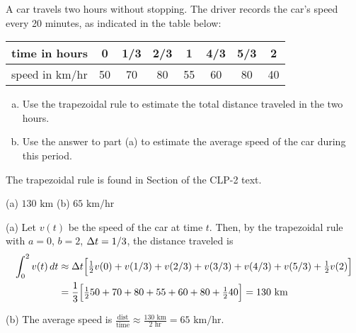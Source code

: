 \begin{Mquestion}[1997A]
A car travels two hours without stopping. The driver records
the car's speed every 20 minutes, as indicated in the table below:

\renewcommand{\arraystretch}{1.1}
\begin{center}
     \begin{tabular}{|l|c|c|c|c|c|c|c|}
          \hline
          time in hours&0&1/3&2/3&1&4/3&5/3&2  \\
          \hline
          speed in km/hr&50&70&80&55&60&80&40 \\
          \hline
     \end{tabular}
\end{center}
\renewcommand{\arraystretch}{1.0}

\begin{enumerate}[(a)]
\item
 Use the trapezoidal rule to estimate the total distance traveled in the two hours.
\item
 Use the answer to part (a)  to estimate the average speed of
the car during this period.
\end{enumerate}
\end{Mquestion}
\begin{hint}
The trapezoidal rule is found in  Section   of the
CLP-2 text.
\end{hint}

\begin{answer}
(a) $130\text{ km}$
\qquad (b)
$65\text{ km/hr}$

\end{answer}

\begin{solution} (a)
 Let $v(t)$ be the speed of the car at time $t$. Then,
by the trapezoidal rule with $a=0$, $b=2$, $\Delta t=1/3$, the distance traveled
is
\begin{align*}
\int_0^2 v(t)\,dt
&\approx\Delta t\Big[\tfrac{1}{2} v(0)+v(1/3)+v(2/3)+v(3/3)
                      +v(4/3)+v(5/3)+\tfrac{1}{2} v(2)\Big]\\
&=\frac{1}{3}\Big[\tfrac{1}{2} 50+70+80+55+60+80+\tfrac{1}{2} 40\Big]
=130\text{ km}
\end{align*}

\noindent (b)
The average speed is $\frac{\text{dist}}{\text{time}} \approx \frac{130\text{ km}}{2\text{ hr}} =  65\text{ km/hr}$.
\end{solution}

